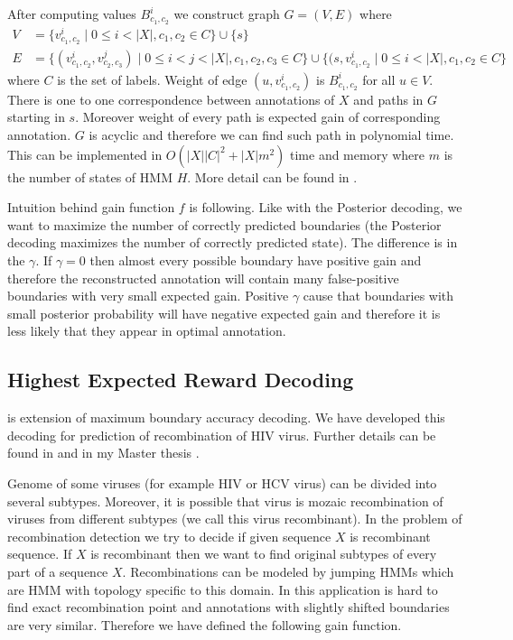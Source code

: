After computing values $B^i_{c_1,c_2}$ we construct graph $G=(V,E)$ where
\begin{align*}
V&=\{v^i_{c_1,c_2}\mid 0\leq i<|X|,c_1,c_2\in C\}\cup\{s\}\\
E&=\{(v^i_{c_1,c_2},v^j_{c_2,c_3})\mid 0\leq i<j< |X|, c_1,c_2,c_3\in C
\}\cup\{(s,v^i_{c_1,c_2}\mid 0\leq i< |X|, c_1,c_2\in C\} 
\end{align*}
where $C$ is the set
of labels. Weight of edge $(u,v^i_{c_1,c_2})$ is $B^i_{c_1,c_2}$ for all $u\in
V$. There is one to one correspondence between annotations of $X$ and paths in
$G$ starting in $s$. Moreover weight of every path is expected gain of
corresponding annotation. $G$ is acyclic and therefore we can find such path in
polynomial time. This can be implemented in $O(|X||C|^2+|X|m^2)$ time and memory
where $m$ is the number of states of HMM $H$. More detail can be found in
\cite{Nanasi2010mgr}.

Intuition behind gain function $f$ is following. Like with the Posterior
decoding, we want to maximize the number of correctly predicted boundaries (the
Posterior decoding maximizes the number of correctly predicted state). The
difference is in the $\gamma$. If $\gamma=0$ then almost every possible boundary
have positive gain and therefore the reconstructed annotation will contain many
false-positive boundaries with very small expected gain. Positive $\gamma$ cause
that boundaries with small posterior probability will have negative expected
gain and therefore it is less likely that they appear in optimal annotation.


\subsection{Highest Expected Reward Decoding}

 is extension of maximum
boundary accuracy decoding. We have developed this decoding for prediction of
recombination of HIV virus.  Further details can be found in \cite{Nanasi2010}
and in my Master thesis \cite{Nanasi2010mgr}.


Genome of some viruses (for example HIV or HCV virus) can be divided into
several subtypes. Moreover, it is possible that virus is mozaic
recombination of viruses from different subtypes (we call this virus
recombinant). In the problem of recombination detection we try to decide if
given sequence $X$ is recombinant sequence. If $X$ is recombinant then we want to find
original subtypes of every part of a sequence $X$. Recombinations can be modeled
by jumping HMMs \cite{Schultz2006} which are HMM with topology specific to this domain.
In this application is 
hard to find exact recombination point and annotations with slightly shifted
boundaries are very similar. Therefore we have defined the following gain
function.

